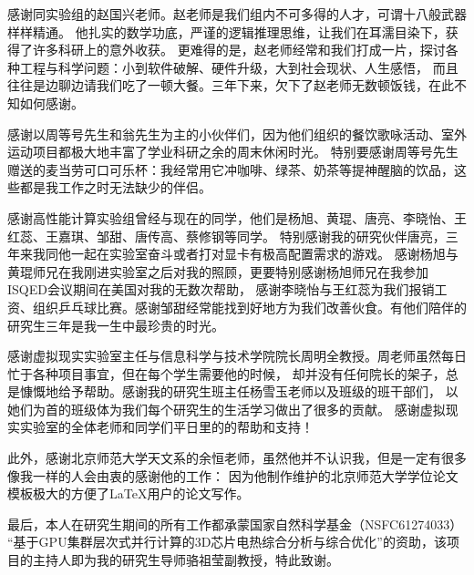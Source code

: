 \begin{ack}
感谢同实验组的赵国兴老师。赵老师是我们组内不可多得的人才，可谓十八般武器样样精通。 他扎实的数学功底，严谨的逻辑推理思维，让我们在耳濡目染下，获得了许多科研上的意外收获。 更难得的是，赵老师经常和我们打成一片，探讨各种工程与科学问题：小到软件破解、硬件升级，大到社会现状、人生感悟， 而且往往是边聊边请我们吃了一顿大餐。三年下来，欠下了赵老师无数顿饭钱，在此不知如何感谢。

感谢以周等号先生和翁先生为主的小伙伴们，因为他们组织的餐饮歌咏活动、室外运动项目都极大地丰富了学业科研之余的周末休闲时光。 特别要感谢周等号先生赠送的麦当劳可口可乐杯：我经常用它冲咖啡、绿茶、奶茶等提神醒脑的饮品，这些都是我工作之时无法缺少的伴侣。

感谢高性能计算实验组曾经与现在的同学，他们是杨旭、黄琨、唐亮、李晓怡、王红蕊、王嘉琪、邹甜、唐传高、蔡修钢等同学。 特别感谢我的研究伙伴唐亮，三年来我同他一起在实验室奋斗或者打对显卡有极高配置需求的游戏。 感谢杨旭与黄琨师兄在我刚进实验室之后对我的照顾，更要特别感谢杨旭师兄在我参加ISQED会议期间在美国对我的无数次帮助， 感谢李晓怡与王红蕊为我们报销工资、组织乒乓球比赛。感谢邹甜经常能找到好地方为我们改善伙食。有他们陪伴的研究生三年是我一生中最珍贵的时光。

感谢虚拟现实实验室主任与信息科学与技术学院院长周明全教授。周老师虽然每日忙于各种项目事宜，但在每个学生需要他的时候， 却并没有任何院长的架子，总是慷慨地给予帮助。感谢我的研究生班主任杨雪玉老师以及班级的班干部们， 以她们为首的班级体为我们每个研究生的生活学习做出了很多的贡献。 感谢虚拟现实实验室的全体老师和同学们平日里的的帮助和支持！

此外，感谢北京师范大学天文系的余恒老师，虽然他并不认识我，但是一定有很多像我一样的人会由衷的感谢他的工作： 因为他制作维护的北京师范大学学位论文模板极大的方便了\LaTeX{}用户的论文写作。

最后，本人在研究生期间的所有工作都承蒙国家自然科学基金（NSFC61274033） “基于GPU集群层次式并行计算的3D芯片电热综合分析与综合优化”的资助，该项目的主持人即为我的研究生导师骆祖莹副教授，特此致谢。
\end{ack}
